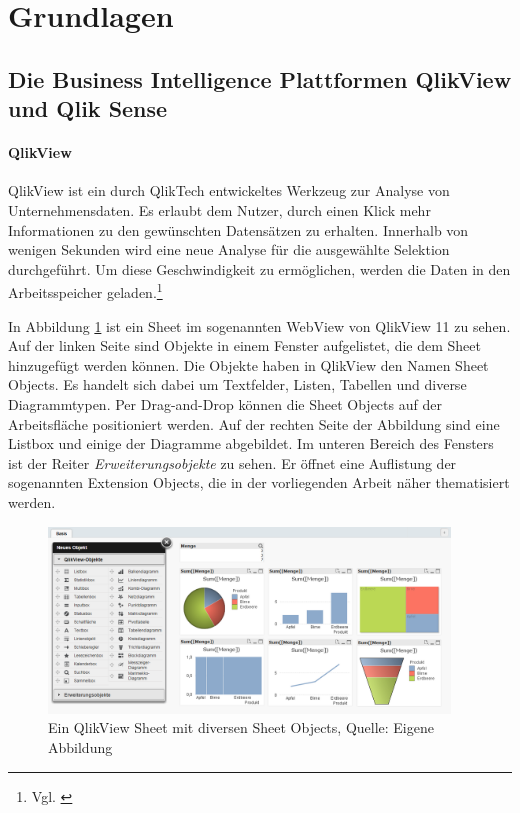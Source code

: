 \section{Grundlagen}
\label{lab:Grundlagen} 

\subsection{Die Business Intelligence Plattformen QlikView und Qlik Sense}

\paragraph{QlikView}
QlikView ist ein durch QlikTech entwickeltes Werkzeug zur Analyse von Unternehmensdaten. Es erlaubt dem Nutzer, durch einen Klick mehr Informationen zu den gewünschten Datensätzen zu erhalten. Innerhalb von wenigen Sekunden wird eine neue Analyse für die ausgewählte Selektion durchgeführt. Um diese Geschwindigkeit zu ermöglichen, werden die Daten in den Arbeitsspeicher geladen.\footnote{Vgl. \cite[S. 90]{stasienkobi}}


In Abbildung \ref{fig:Sheet} ist ein Sheet im sogenannten WebView von QlikView 11 zu sehen. Auf der linken Seite sind Objekte in einem Fenster aufgelistet, die dem Sheet hinzugefügt werden können. Die Objekte haben in QlikView den Namen Sheet Objects. Es handelt sich dabei um Textfelder, Listen, Tabellen und diverse Diagrammtypen. Per Drag-and-Drop können die Sheet Objects auf der Arbeitsfläche positioniert werden. Auf der rechten Seite der Abbildung sind eine Listbox und einige der Diagramme abgebildet. Im unteren Bereich des Fensters ist der Reiter \textit{Erweiterungsobjekte} zu sehen. Er öffnet eine Auflistung der sogenannten Extension Objects, die in der vorliegenden Arbeit näher thematisiert werden.

\ifIncludeFigures\begin{figure}[htbp]
	\centering
		\includegraphics[width=0.95\textwidth]{img/QlikView/Sheet.png}
	\caption[Ein QlikView Sheet mit diversen Sheet Objects]{Ein QlikView Sheet mit diversen Sheet Objects, Quelle: Eigene Abbildung}
	\label{fig:Sheet}
\end{figure}\fi


